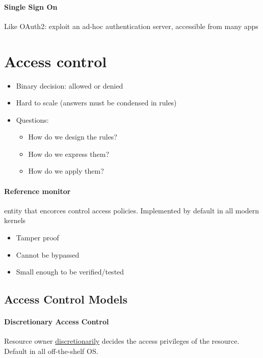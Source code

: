 \documentclass{article}
\begin{document}
\paragraph{Single Sign On} Like OAuth2: exploit an ad-hoc authentication server, accessible from many apps

\section{Access control}
\begin{itemize}
\item Binary decision: allowed or denied
\item Hard to scale (answers must be condensed in rules)
\item Questions:
	\begin{itemize}
	\item How do we design the rules?
	\item How do we express them?
	\item How do we apply them?
	\end{itemize}
\end{itemize}
\paragraph{Reference monitor} entity that encorces control access policies. Implemented by default in all modern kernels
\begin{itemize}
\item Tamper proof
\item Cannot be bypassed
\item Small enough to be verified/tested
\end{itemize}
\subsection{Access Control Models}
\paragraph{Discretionary Access Control} Resource owner \underline{discretionarily} decides the access privileges of the resource. Default in all off-the-shelf OS.
\end{document}
